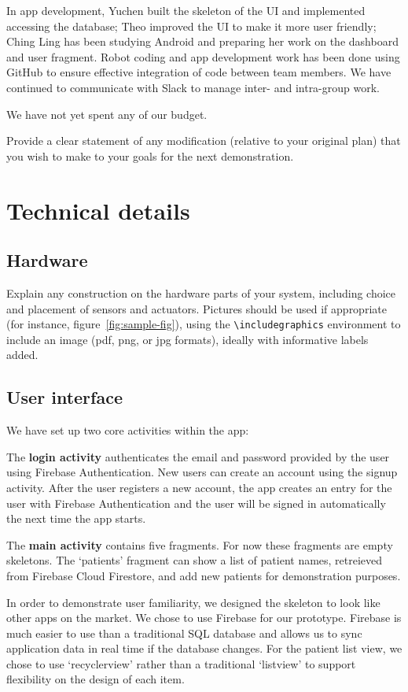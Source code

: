 \documentclass{article}
\begin{document}
In app development, Yuchen built the skeleton of the UI and implemented accessing the database; Theo improved the UI to make it more user friendly; Ching Ling has been studying Android and preparing her work on the dashboard and user fragment. 
Robot coding and app development work has been done using GitHub to ensure effective integration of code between team members. We have continued to communicate with Slack to manage inter- and intra-group work.

We have not yet spent any of our budget. 

Provide a clear statement of any modification (relative to your original plan) that you wish to make to your goals for the next demonstration.

\section{Technical details}


\subsection{Hardware}

Explain any construction on the hardware parts of your system, including choice and placement of sensors and actuators. Pictures should be used if appropriate (for instance, figure~\ref{fig:sample-fig}), using the \verb+\includegraphics+ environment to include an image (pdf, png, or jpg formats), ideally with informative labels added. 

\subsection{User interface}
We have set up two core activities within the app:

The {\bf login activity} authenticates the email and password provided by the user using Firebase Authentication. New users can create an account using the signup activity. After the user registers a new account, the app creates an entry for the user with Firebase Authentication and the user will be signed in automatically the next time the app starts.

The {\bf main activity} contains five fragments. For now these fragments are empty skeletons. The `patients' fragment can show a list of patient names, retreieved from Firebase Cloud Firestore, and add new patients for demonstration purposes.

In order to demonstrate user familiarity, we designed the skeleton to look like other apps on the market. We chose to use Firebase for our prototype. Firebase is much easier to use than a traditional SQL database and allows us to sync application data in real time if the database changes. For the patient list view, we chose to use `recyclerview' rather than a traditional `listview' to support flexibility on the design of each item. 
\end{document}
